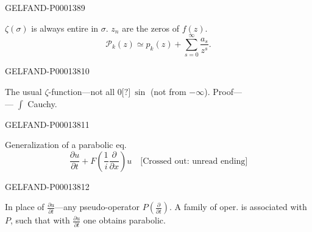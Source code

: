 \begin{GelfandAdjacentEvidence}{GELFAND-P000138}{9}

$\zeta (\sigma)$ is always entire in $\sigma$. $z_n$ are the zeros of $f (z)$.
\begin{equation*}\mathcal P_k (z)\simeq p_k (z)+\sum_{s=0}^{\infty}\frac{a_s}{z^s}.\end{equation*}
\end{GelfandAdjacentEvidence}
\begin{GelfandAdjacentEvidence}{GELFAND-P000138}{10}

The usual $\zeta$-function—not all $0\text{[?]}\ \sin$ (not from $-\infty$). Proof—\\
— $\int$ Cauchy.
\end{GelfandAdjacentEvidence}
\begin{GelfandAdjacentEvidence}{GELFAND-P000138}{11}


 Generalization of a parabolic eq.
\begin{equation*}\frac{\partial u}{\partial t}+F\left (\frac1i\frac{\partial}{\partial x}\right)u\quad\text{[Crossed out: unread ending]}\end{equation*}
\end{GelfandAdjacentEvidence}
\begin{GelfandAdjacentEvidence}{GELFAND-P000138}{12}

In place of $\frac{\partial u}{\partial t}$—any pseudo-operator $P\left (\frac{\partial}{\partial t}\right)$. A family of oper. is associated with $P$, such that with $\frac{\partial u}{\partial t}$ one obtains parabolic.
\end{GelfandAdjacentEvidence}



